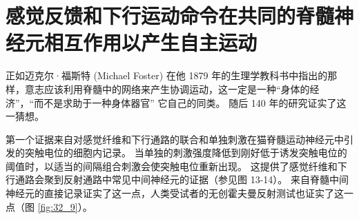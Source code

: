 \section{感觉反馈和下行运动命令在共同的脊髓神经元相互作用以产生自主运动}
正如迈克尔·福斯特 (Michael Foster) 在他 1879 年的生理学教科书中指出的那样，意志应该利用脊髓中的网络来产生协调运动，这一定是一种“身体的经济”，“而不是求助于一种身体器官” 它自己的同类。 随后 140 年的研究证实了这一猜想。

第一个证据来自对感觉纤维和下行通路的联合和单独刺激在猫脊髓运动神经元中引发的突触电位的细胞内记录。 当单独的刺激强度降低到刚好低于诱发突触电位的阈值时，以适当的间隔组合刺激会使突触电位重新出现。 这提供了感觉纤维和下行通路会聚到反射通路中常见中间神经元的证据（参见图 13-14）。 
来自脊髓中间神经元的直接记录证实了这一点，人类受试者的无创霍夫曼反射测试也证实了这一点（图 \ref{fig:32_9}）。

